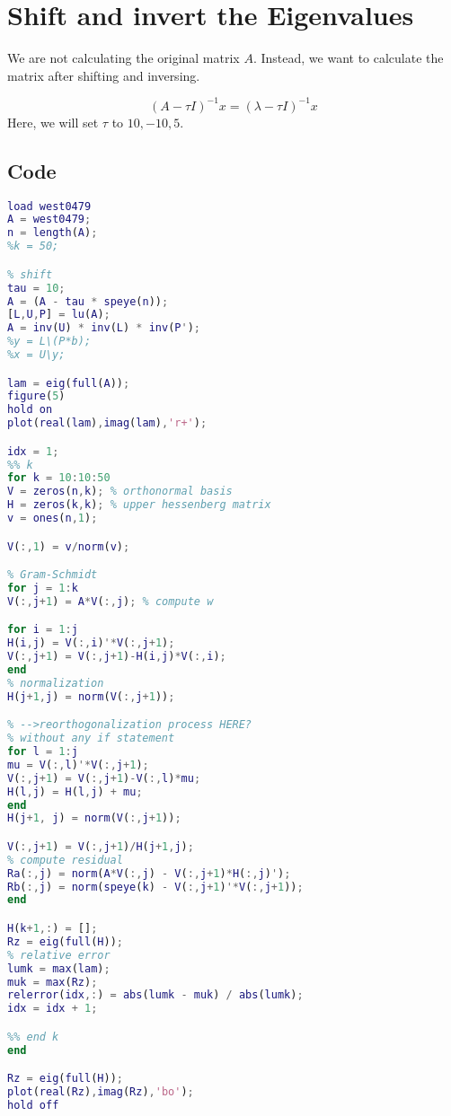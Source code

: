 \documentclass{article}
\begin{document}
\section{Shift and invert the Eigenvalues}
\begin{flushleft}
We are not calculating the original matrix $A$. Instead, we want to calculate the matrix after shifting and inversing.

\[(A-\tau I)^{-1}x = (\lambda-\tau I)^{-1}x\]
Here, we will set $\tau$ to $10, -10, 5$.
\end{flushleft}
\subsection{Code}
\begin{lstlisting}[language=Matlab, caption=shiftandinverse.m]
load west0479
A = west0479;
n = length(A);
%k = 50;

% shift
tau = 10;
A = (A - tau * speye(n));
[L,U,P] = lu(A);
A = inv(U) * inv(L) * inv(P');
%y = L\(P*b);
%x = U\y;

lam = eig(full(A));
figure(5)
hold on
plot(real(lam),imag(lam),'r+');

idx = 1;
%% k
for k = 10:10:50
V = zeros(n,k); % orthonormal basis
H = zeros(k,k); % upper hessenberg matrix
v = ones(n,1);

V(:,1) = v/norm(v);

% Gram-Schmidt
for j = 1:k
V(:,j+1) = A*V(:,j); % compute w

for i = 1:j
H(i,j) = V(:,i)'*V(:,j+1);
V(:,j+1) = V(:,j+1)-H(i,j)*V(:,i);
end
% normalization
H(j+1,j) = norm(V(:,j+1));

% -->reorthogonalization process HERE?
% without any if statement
for l = 1:j
mu = V(:,l)'*V(:,j+1);
V(:,j+1) = V(:,j+1)-V(:,l)*mu;
H(l,j) = H(l,j) + mu;
end
H(j+1, j) = norm(V(:,j+1));

V(:,j+1) = V(:,j+1)/H(j+1,j);
% compute residual
Ra(:,j) = norm(A*V(:,j) - V(:,j+1)*H(:,j)');
Rb(:,j) = norm(speye(k) - V(:,j+1)'*V(:,j+1));
end

H(k+1,:) = []; 
Rz = eig(full(H));
% relative error
lumk = max(lam);
muk = max(Rz);
relerror(idx,:) = abs(lumk - muk) / abs(lumk);
idx = idx + 1;

%% end k
end

Rz = eig(full(H));
plot(real(Rz),imag(Rz),'bo');
hold off
\end{lstlisting}
\end{document}
